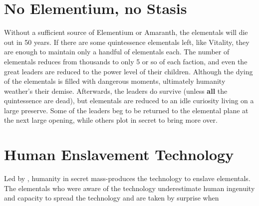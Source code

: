 \documentclass[green]{elementals}
\begin{document}
\section{No Elementium, no Stasis}

Without a sufficient source of Elementium or Amaranth, the elementals will die out in 50 years. If there are some quintessence elementals left, like Vitality, they are enough to maintain only a handful of elementals each. The number of elementals reduces from thousands to only 5 or so of each faction, and even the great leaders are reduced to the power level of their children. Although the dying of the elementals is filled with dangerous moments, ultimately humanity weather's their demise. Afterwards, the leaders do survive (unless \textbf{all} the quintessence are dead), but elementals are reduced to an idle curiosity living on a large preserve. Some of the leaders beg to be returned to the elemental plane at the next large opening, while others plot in secret to bring more over.

\section{Human Enslavement Technology}

Led by \cGD{\intro}, humanity in secret mass-produces the technology to enslave elementals. The elementals who were aware of the technology underestimate human ingenuity and capacity to spread the technology and are taken by surprise when 
\end{document}
